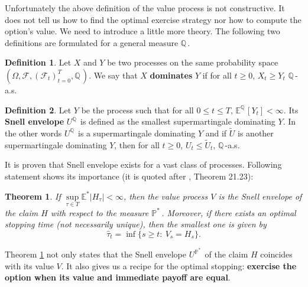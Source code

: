 \documentclass[a4paper,11pt, twoside]{book}
\newtheorem{thm}{Theorem}[chapter]
\theoremstyle{definition}
\newtheorem{mydef}{Definition}[chapter]
\theoremstyle{remark}
\def\E{{\mathbb{E}}}
\def\Q{{\mathbb{Q}}\,}
\def\Em{{\mathbb{E}^*}}
\def\Pm{{\mathbb{P}}^*\,}
\begin{document}
Unfortunately the above definition of the value process is not constructive. It does not tell us how to find the optimal exercise strategy nor how to compute the option's value. We need to introduce a little more theory. The following two definitions are formulated for a general measure $\Q$. 

\begin{mydef}
 Let $X$ and $Y$ be two processes on the same probability space $(\Omega, \mathcal{F}, (\mathcal{F}_t)_{t=0}^T, \Q)$. We say that $X$ \textbf{dominates} $Y$ if for all $t \geq 0$, $X_t \geq Y_t$ $\Q$-a.s.
\end{mydef}
 
\begin{mydef}
 Let $Y$ be the process such that for all $0 \leq t \leq T$, $\E^{\Q}[Y_t] < \infty$. Its \textbf{Snell envelope} $U^{\Q}$ is defined as the smallest supermartingale dominating $Y$. In the other words $U^{\Q}$ is a supermartingale dominating $Y$ and if $\tilde{U}$ is another supermartingale dominating $Y$, then for all $t \geq 0$, $U_t \leq \tilde{U}_t$, $\Q$-a.s.
\end{mydef}
It is proven that Snell envelope exists for a vast class of processes. Following statement shows its importance (it is quoted after \cite{bjork}, Theorem 21.23):
\begin{thm}
 \label{thm:snell}
 If $\sup\limits_{\tau \in T} \Em|H_{\tau}| < \infty$, then the value process $V$ is the Snell envelope of the claim $H$ with respect to the measure $\Pm$. Moreover, if there exists an optimal stopping time (not necessarily unique), then the smallest one is given by
 \begin{equation}
  \label{eq:optStop}
  \hat{\tau}_t = \inf\{ s \geq t:\ V_s = H_s \}.
 \end{equation}
\end{thm}
Theorem \ref{thm:snell} not only states that the Snell envelope $U^{\Pm}$ of the claim $H$ coincides with its value $V$. It also gives us a recipe for the optimal stopping: \textbf{exercise the option when its value and immediate payoff are equal}.
\end{document}
